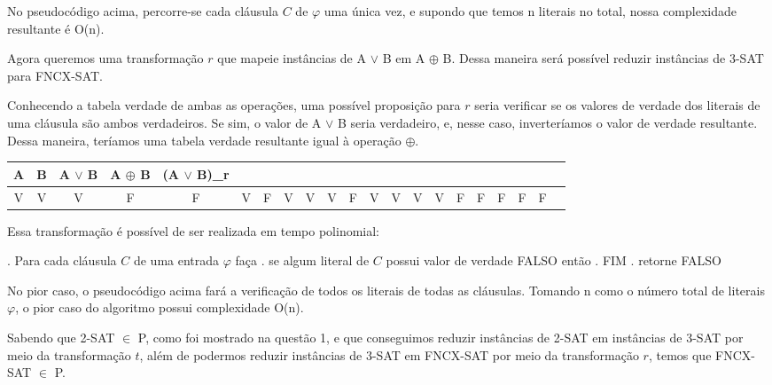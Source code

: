 \documentclass[12pt]{article}
\begin{document}
\begin{enumerate}
{  No pseudocódigo acima, percorre-se cada cláusula $C$ de $\varphi$ uma única vez, e supondo que temos n literais no total, nossa complexidade resultante é O(n).
  
  Agora queremos uma transformação $r$ que mapeie instâncias de A $\vee$ B em A $\oplus$ B. Dessa maneira será possível reduzir instâncias de 3-SAT para FNCX-SAT.
  
  Conhecendo a tabela verdade de ambas as operações, uma possível proposição para $r$ seria verificar se os valores de verdade dos literais de uma cláusula são ambos verdadeiros. Se sim, o valor de A $\vee$ B seria verdadeiro, e, nesse caso, inverteríamos o valor de verdade resultante. Dessa maneira, teríamos uma tabela verdade resultante igual à operação $\oplus$.
  
  \begin{center}
  \begin{tabular}{|c|c|c|c|c|} \hline
      A & B & A $\vee$ B & A $\oplus$ B & (A $\vee$ B)_r\\ \hline
      V & V & V & F & F & \hline
      V & F & V & V & V & \hline
      F & V & V & V & V & \hline
      F & F & F & F & F & \hline
  \end{tabular}
  \end{center}
  
  Essa transformação é possível de ser realizada em tempo polinomial:
  \begin{itemize}
      . Para cada cláusula $C$ de uma entrada $\varphi$ faça      \newline
      . \quad se algum literal de $C$ possui valor de verdade FALSO então      \newline
      . \quad \quad \quad FIM      \newline
      . retorne FALSO
  \end{itemize}
  
  No pior caso, o pseudocódigo acima fará a verificação de todos os literais de todas as cláusulas. Tomando n como o número total de literais $\varphi$, o pior caso do algoritmo possui complexidade O(n).
  
  Sabendo que 2-SAT $\in$ P, como foi mostrado na questão 1, e que conseguimos reduzir instâncias de 2-SAT em instâncias de 3-SAT por meio da transformação $t$, além de podermos reduzir instâncias de 3-SAT em FNCX-SAT por meio da transformação $r$, temos que FNCX-SAT $\in$ P.
  }
\end{enumerate}
\end{document}
